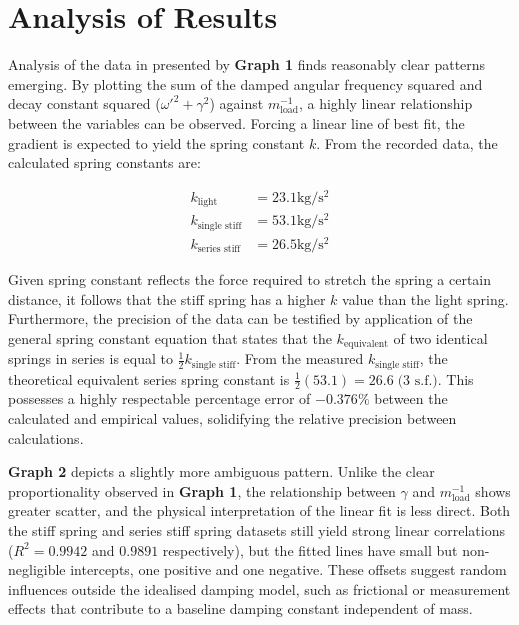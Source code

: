 \section{Analysis of Results}

Analysis of the data in presented by \textbf{Graph 1} finds reasonably clear patterns emerging. By plotting the sum of the damped angular frequency squared and decay constant squared ($\omega'^2 + \gamma^2$) against $m_{\text{load}}^{-1}$, a highly linear relationship between the variables can be observed. Forcing a linear line of best fit, the gradient is expected to yield the spring constant $k$. From the recorded data, the calculated spring constants are:

\vspace{-1em}

\begin{align*}
k_{\text{light}} &= 23.1 \si{\kilo\gram\per\second\squared} \\
k_{\text{single stiff}} &= 53.1 \si{\kilo\gram\per\second\squared} \\
k_{\text{series stiff}} &= 26.5 \si{\kilo\gram\per\second\squared}
\end{align*}

Given spring constant reflects the force required to stretch the spring a certain distance, it follows that the stiff spring has a higher $k$ value than the light spring. Furthermore, the precision of the data can be testified by application of the general spring constant equation that states that the $k_{\text{equivalent}}$ of two identical springs in series is equal to $\tfrac{1}{2}k_{\text{single stiff}}$. From the measured $k_{\text{single stiff}}$, the theoretical equivalent series spring constant is $\tfrac{1}{2} \left( 53.1 \right) = 26.6 \; \text{(3 s.f.)}$. This possesses a highly respectable percentage error of $- 0.376 \%$ between the calculated and empirical values, solidifying the relative precision between calculations.

\textbf{Graph 2} depicts a slightly more ambiguous pattern. Unlike the clear proportionality observed in \textbf{Graph 1}, the relationship between $\gamma$ and $m_{\text{load}}^{-1}$ shows greater scatter, and the physical interpretation of the linear fit is less direct. Both the stiff spring and series stiff spring datasets still yield strong linear correlations ($R^2 = 0.9942$ and $0.9891$ respectively), but the fitted lines have small but non-negligible intercepts, one positive and one negative. These offsets suggest random influences outside the idealised damping model, such as frictional or measurement effects that contribute to a baseline damping constant independent of mass.

